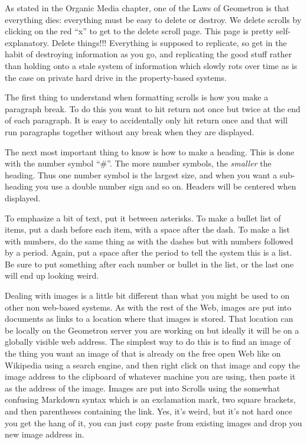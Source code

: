 As stated in the Organic Media chapter, one of the Laws of Geometron is that everything dies: everything must be easy to delete or destroy. We delete scrolls by clicking on the red ``x'' to get to the delete scroll page.  This page is pretty self-explanatory.  Delete things!!! Everything is supposed to replicate, so get in the habit of destroying information as you go, and replicating the good stuff rather than holding onto a stale system of information which slowly rots over time as is the case on private hard drive in the property-based systems.

The first thing to understand when formatting scrolls is how you make a paragraph break.  To do this you want to hit return not once but twice at the end of each paragraph. It is easy to accidentally only hit return once and that will run paragraphs together without any break when they are displayed.  

The next most important thing to know is how to make a heading.  This is done with the number symbol ``\#''.  The more number symbols, the \emph{smaller} the heading.  Thus one number symbol is the largest size, and when you want a sub-heading you use a double number sign and so on.  Headers will be centered when displayed.  

To emphasize a bit of text, put it between asterisks. To make a bullet list of items, put a dash before each item, with a space after the dash. To make a list with numbers, do the same thing as with the dashes but with numbers followed by a period. Again, put a space after the period to tell the system this is a list.  Be sure to put something after each number or bullet in the list, or the last one will end up looking weird.

Dealing with images is a little bit different than what you might be used to on other non web-based systems.  As with the rest of the Web, images are put into documents as links to a location where that images is stored.  That location can be locally on the Geometron server you are working on but ideally it will be on a globally visible web address.  The simplest way to do this is to find an image of the thing you want an image of that is already on the free open Web like on Wikipedia using a search engine, and then right click on that image and copy the image address to the clipboard of whatever machine you are using, then paste it as the address of the image.  Images are put into Scrolls using the somewhat confusing Markdown syntax which is an exclamation mark, two square brackets, and then parentheses containing the link.  Yes, it's weird, but it's not hard once you get the hang of it, you can just copy paste from existing images and drop you new image address in.  

